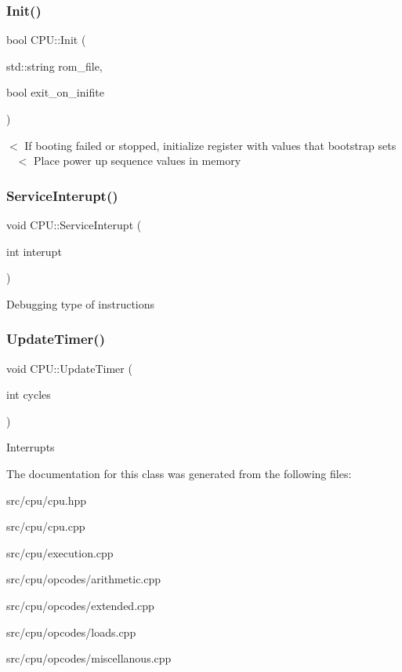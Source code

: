 \subsubsection{\texorpdfstring{Init()}{Init()}}
{\footnotesize\ttfamily bool C\+P\+U\+::\+Init (\begin{DoxyParamCaption}\item[{std\+::string}]{rom\+\_\+file,  }\item[{bool}]{exit\+\_\+on\+\_\+inifite }\end{DoxyParamCaption})}

$<$ If booting failed or stopped, initialize register with values that bootstrap sets ~\newline
 $<$ Place power up sequence values in memory \mbox{\label{classCPU_ab932fc0e9d81733f90e878d644991e2e}} 
\subsubsection{\texorpdfstring{Service\+Interupt()}{ServiceInterupt()}}
{\footnotesize\ttfamily void C\+P\+U\+::\+Service\+Interupt (\begin{DoxyParamCaption}\item[{int}]{interupt }\end{DoxyParamCaption})}

Debugging type of instructions \mbox{\label{classCPU_ad8eb59dff5e4fe4c1b2881cc67574ddf}} 
\subsubsection{\texorpdfstring{Update\+Timer()}{UpdateTimer()}}
{\footnotesize\ttfamily void C\+P\+U\+::\+Update\+Timer (\begin{DoxyParamCaption}\item[{int}]{cycles }\end{DoxyParamCaption})}

Interrupts 

The documentation for this class was generated from the following files\+:\begin{DoxyCompactItemize}
\item 
src/cpu/cpu.\+hpp\item 
src/cpu/cpu.\+cpp\item 
src/cpu/execution.\+cpp\item 
src/cpu/opcodes/arithmetic.\+cpp\item 
src/cpu/opcodes/extended.\+cpp\item 
src/cpu/opcodes/loads.\+cpp\item 
src/cpu/opcodes/miscellanous.\+cpp\end{DoxyCompactItemize}

